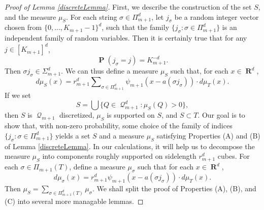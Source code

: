 \documentclass[12pt,reqno]{article}
\numberwithin{equation}{section}
\DeclareMathOperator{\RR}{\mathbf{R}}
\DeclareMathOperator{\PP}{\mathbf{P}}
\DeclareMathOperator{\DQ}{\mathcal{Q}}
\begin{document}
\begin{proof}[Proof of Lemma \ref{discreteLemma}]
    \renewcommand{\qedsymbol}{}
    First, we describe the construction of the set $S$, and the measure $\mu_S$. For each string $\sigma \in \Pi_{m+1}^d$, let $j_\sigma$ be a random integer vector chosen from $\{ 0, \dots, K_{m+1} - 1 \}^d$, such that the family $\{ j_\sigma : \sigma \in \Pi_{m+1}^d \}$ is an independent family of random variables. Then it is certainly true that for any $j \in [K_{m+1}]^d$,
    \begin{equation} \label{equation129412904912090}
        \PP(j_\sigma = j) = K_{m+1}^{-d}.
    \end{equation}
    Then $\sigma j_\sigma \in \Sigma_{m+1}^d$. We can thus define a measure $\mu_S$ such that, for each $x \in \RR^d$,
    \[ d\mu_S(x) = r_{m+1}^d \sum\nolimits_{\sigma \in \Pi_{m+1}^d} \psi_{m+1}(x - a(\sigma j_\sigma)) \cdot d\mu_T(x). \]
    If we set
    \[ S = \bigcup \{ Q \in \DQ_{m+1}^d : \mu_S(Q) > 0 \}, \]
    then $S$ is $\DQ_{m+1}$ discretized, $\mu_S$ is supported on $S$, and $S \subset T$. Our goal is to show that, with non-zero probability, some choice of the family of indices $\{ j_\sigma : \sigma \in \Pi_{m+1}^d \}$ yields a set $S$ and a measure $\mu_S$ satisfying Properties (A) and (B) of Lemma \ref{discreteLemma}. In our calculations, it will help us to decompose the measure $\mu_S$ into components roughly supported on sidelength $r_{m+1}^d$ cubes. For each $\sigma \in \Pi_{m+1}(T)$, define a measure $\mu_\sigma$ such that for each $x \in \RR^d$,
    \[ d\mu_\sigma(x) = r_{m+1}^d \psi_{m+1}(x - a(\sigma j_\sigma)) \cdot d\mu_T(x). \]
    Then $\mu_S = \sum_{\sigma \in \Pi_{m+1}^d(T)} \mu_\sigma$. We shall split the proof of Properties (A), (B), and (C) into several more managable lemmas.
\end{proof}
\end{document}
